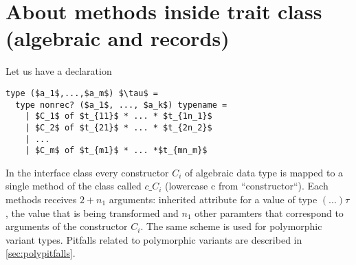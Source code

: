 \documentclass[acmsmall,review,anonymous]{acmart}\settopmatter{printfolios=true,printccs=false,printacmref=false}
\begin{document}
% 
  

\section{About methods inside trait class (algebraic and records)}
\label{sec:methods}

Let us have a declaration
\begin{lstlisting}
type ($a_1$,...,$a_m$) $\tau$ = 
  type nonrec? ($a_1$, ..., $a_k$) typename =
    | $C_1$ of $t_{11}$ * ... * $t_{1n_1}$
    | $C_2$ of $t_{21}$ * ... * $t_{2n_2}$
    | ...
    | $C_m$ of $t_{m1}$ * ... *$t_{mn_m}$
\end{lstlisting}
In the interface class every constructor $C_i$ of algebraic data type is mapped to a single method of the class called $c\_C_i$ (lowercase c from ``constructor``). Each methods receives $2+n_1$ arguments: inherited attribute for a value of type $(...) \tau$, the value that is being transformed and $n_1$ other paramters that correspond to arguments of the constructor $C_i$. The same scheme is used for polymorphic variant types. Pitfalls related to polymorphic variants are described in \autoref{sec:polypitfalls}.
\end{document}
